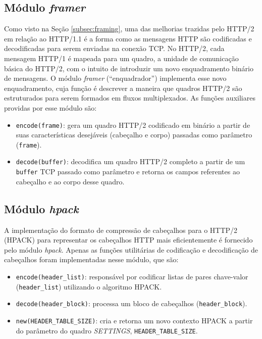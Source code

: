 \subsection{Módulo {\em framer}}
\label{subsec:framer}

Como visto na Seção \ref{subsec:framing}, uma das melhorias trazidas pelo HTTP/2 em relação ao HTTP/1.1 é a forma como as mensagens HTTP são codificadas e decodificadas para serem enviadas na conexão TCP. No HTTP/2, cada mensagem HTTP/1 é mapeada para um quadro, a unidade de comunicação básica do HTTP/2, com o intuito de introduzir um novo enquadramento binário de mensagens. O módulo {\em framer} (``enquadrador'') implementa esse novo enquadramento, cuja função é descrever a maneira que quadros HTTP/2 são estruturados para serem formados em fluxos multiplexados. As funções auxiliares providas por esse módulo são:

\begin{itemize}
    \item \verb|encode(frame)|: gera um quadro HTTP/2 codificado em binário a partir de suas características desejáveis (cabeçalho e corpo) passadas como parâmetro (\verb|frame|).
    \item \verb|decode(buffer)|: decodifica um quadro HTTP/2 completo a partir de um \verb|buffer| TCP passado como parâmetro e retorna os campos referentes ao cabeçalho e ao corpo desse quadro.
\end{itemize}

\subsection{Módulo {\em hpack}}
\label{subsec:hpack}

A implementação do formato de compressão de cabeçalhos para o HTTP/2 (HPACK) \cite{BelsheRFC7541} para representar os cabeçalhos HTTP mais eficientemente é fornecido pelo módulo {\em hpack}. Apenas as funções utilitárias de codificação e decodificação de cabeçalhos foram implementadas nesse módulo, que são:

\begin{itemize}
    \item \verb|encode(header_list)|: responsável por codificar listas de pares chave-valor (\verb|header_list|) utilizando o algoritmo HPACK.
    \item \verb|decode(header_block)|: processa um bloco de cabeçalhos (\verb|header_block|).
    \item \verb|new(HEADER_TABLE_SIZE)|: cria e retorna um novo contexto HPACK a partir do parâmetro do quadro {\em SETTINGS}, \verb|HEADER_TABLE_SIZE|.
\end{itemize}

